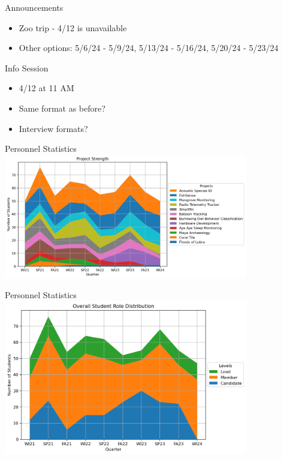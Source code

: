 \begin{frame}{Announcements}
    \begin{itemize}
        \item Zoo trip - 4/12 is unavailable
        \item Other options: 5/6/24 - 5/9/24, 5/13/24 - 5/16/24, 5/20/24 - 5/23/24
    \end{itemize}
\end{frame}
\begin{frame}{Info Session}
    \begin{itemize}
        \item 4/12 at 11 AM
        \item Same format as before?
        \item Interview formats?
    \end{itemize}
\end{frame}
\begin{frame}{Personnel Statistics}
    \centering
    \includegraphics[width=0.8\textwidth,height=0.8\textheight,keepaspectratio]{images/image.png}
\end{frame}
\begin{frame}{Personnel Statistics}
    \centering
    \includegraphics[width=0.8\textwidth,height=0.8\textheight,keepaspectratio]{images/image (1).png}
\end{frame}
